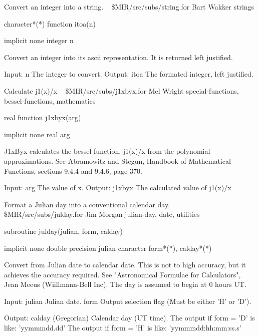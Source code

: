 %
\noindent Convert an integer into a string.
\newline \ 
\newline {} \$MIR/src/subs/string.for
\newline {} Bart Wakker
\newline {} strings
\par{\tenpoint
{\eightpoint\begintt
        character*(*) function itoa(n)

        implicit none
        integer n

  Convert an integer into its ascii representation. It is returned
  left justified.

  Input:
    n          The integer to convert.
  Output:
    itoa       The formated integer, left justified.
\endtt}
\par}
%
\noindent Calculate j1(x)/x
\newline \ 
\newline {} \$MIR/src/subs/j1xbyx.for
\newline {} Mel Wright
\newline \abox{Keywords:} special-functions, bessel-functions, mathematics
\par{\tenpoint
{\eightpoint\begintt
        real function j1xbyx(arg)

        implicit none
        real arg

   J1xByx calculates the bessel function,  j1(x)/x  from the
   polynomial approximations. See Abramowitz and Stegun, Handbook of
   Mathematical Functions, sections 9.4.4 and 9.4.6, page 370.

  Input:
    arg        The value of x.
  Output:
    j1xbyx     The calculated value of j1(x)/x
\endtt}
\par}
%
\noindent Format a Julian day into a conventional calendar day.
\newline \ 
\newline {} \$MIR/src/subs/julday.for
\newline \abox{Responsible:} Jim Morgan
\newline {} julian-day, date, utilities
\par{\tenpoint
{\eightpoint\begintt
      subroutine julday(julian, form, calday)

      implicit none
      double precision julian
      character form*(*), calday*(*)

  Convert from Julian date to calendar date.  This is not to high
  accuracy, but it achieves the accuracy required.  See "Astronomical
  Formulae for Calculators", Jean Meeus (Wiillmann-Bell Inc).
  The day is assumed to begin at 0 hours UT.

  Input:
    julian      Julian date.
    form       Output selection flag (Must be either 'H' or 'D').

  Output:
    calday      (Gregorian) Calendar day (UT time).
                The output if form = 'D' is like:
                       'yymmmdd.dd'
                The output if form = 'H' is like:
                       'yymmmdd:hh:mm:ss.s'
\endtt}
\par}
